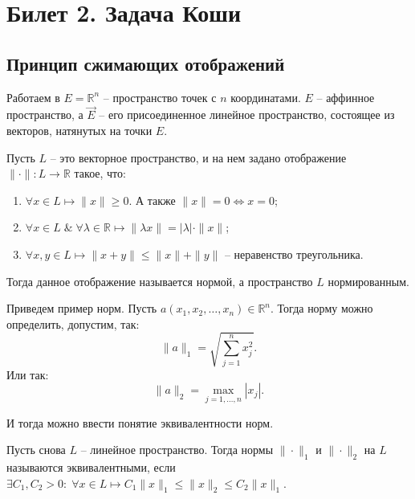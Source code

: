 \section{Билет 2. Задача Коши}
\subsection{Принцип сжимающих отображений}

Работаем в $E =\mathbb{R}^n$ -- пространство точек с $n$ координатами. $E$ -- аффинное пространство, а $\vec{E}$ -- его присоединенное линейное пространство, состоящее из векторов, натянутых на точки $E$.

\begin{definition}
	Пусть $L$ -- это векторное пространство, и на нем задано отображение $\|\cdot\|:L\longrightarrow \mathbb{R}$ такое, что:
	\begin{enumerate}
		\item $\forall x \in L \longmapsto \|x\| \geqslant 0$. А также $\|x\| = 0 \Longleftrightarrow x = 0$;
		
		\item $\forall x \in L \; \& \; \forall \lambda \in \mathbb{R} \longmapsto \|\lambda x\| = |\lambda| \cdot \|x\|$;
		
		\item $\forall x, y \in L \longmapsto \|x+y\| \leqslant \|x\| + \|y\|$ -- неравенство треугольника.
	\end{enumerate}
	Тогда данное отображение называется нормой, а пространство $L$ нормированным.
\end{definition}

\begin{example}
	Приведем пример норм. Пусть $a(x_1, x_2, \dots, x_n) \in \mathbb{R}^n$. Тогда норму можно определить, допустим, так:
	\begin{equation}
		\|a\|_1 = \sqrt{\sum_{j = 1}^{n} x_j^2}.
	\end{equation}
Или так:
	\begin{equation}
		\|a\|_2 = \max_{j = 1, \dots, n}|x_j|.
	\end{equation}
\end{example}

И тогда можно ввести понятие эквивалентности норм.

\begin{definition}
	Пусть снова $L$ -- линейное пространство. Тогда нормы $\| \cdot \|_1$ и $\| \cdot \|_2$ на $L$ называются эквивалентными, если $\exists C_1, C_2 > 0: \; \forall x \in L \longmapsto C_1\|x\|_1 \leqslant \|x\|_2 \leqslant C_2\|x\|_1$.
\end{definition}

